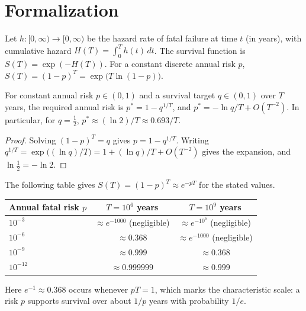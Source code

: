 \section*{Formalization}

Let $h:[0,\infty)\to[0,\infty)$ be the hazard rate of fatal failure at time $t$ (in years), with cumulative hazard $H(T)=\int_0^T h(t)\,dt$. The survival function is $S(T)=\exp(-H(T))$. For a constant discrete annual risk $p$, $S(T)=(1-p)^T=\exp\big(T\ln(1-p)\big)$.

\begin{proposition}
For constant annual risk $p\in(0,1)$ and a survival target $q\in(0,1)$ over $T$ years, the required annual risk is $p^\ast=1-q^{1/T}$, and $p^\ast=-\ln q/T+O(T^{-2})$. In particular, for $q=\tfrac12$, $p^\ast\approx(\ln2)/T\approx0.693/T$.
\end{proposition}

\begin{proof}
Solving $(1-p)^T=q$ gives $p=1-q^{1/T}$. Writing $q^{1/T}=\exp\big((\ln q)/T\big)=1+(\ln q)/T+O(T^{-2})$ gives the expansion, and $\ln\tfrac12=-\ln2$.
\end{proof}

The following table gives $S(T)=(1-p)^T\approx e^{-pT}$ for the stated values.

\begin{center}
\begin{tabular}{@{}lcc@{}}
\toprule
Annual fatal risk $p$ & $T=10^{6}$ years & $T=10^{9}$ years \\
\midrule
$10^{-3}$  & $\approx e^{-1000}$ (negligible) & $\approx e^{-10^{6}}$ (negligible) \\
$10^{-6}$  & $\approx 0.368$ & $\approx e^{-1000}$ (negligible) \\
$10^{-9}$  & $\approx 0.999$ & $\approx 0.368$ \\
$10^{-12}$ & $\approx 0.999999$ & $\approx 0.999$ \\
\bottomrule
\end{tabular}
\end{center}

Here $e^{-1}\approx0.368$ occurs whenever $pT=1$, which marks the characteristic scale: a risk $p$ supports survival over about $1/p$ years with probability $1/e$.

